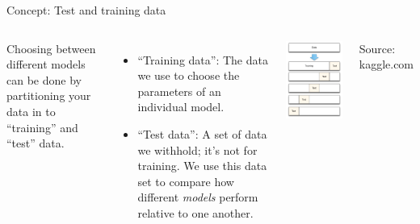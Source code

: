 \documentclass[aspectratio=169]{beamer}
\begin{document}
\begin{frame}{Concept:  Test and training data}


\begin{columns}


Choosing between different models can be done by partitioning your data in to ``training'' and ``test'' data.

\begin{itemize}
\item ``Training data'': The data we use to choose the parameters of an individual model. 

\hspace{5mm}

\item ``Test data'': A set of data we withhold; it's not for training.  We use this data set to compare how different \textit{models} perform relative to one another.  

\end{itemize}

\includegraphics[scale=0.35]{figures/07_cross_validation_diagram}
\begin{tiny}
Source: kaggle.com
\end{tiny}
\end{columns}


\end{frame}
\end{document}
